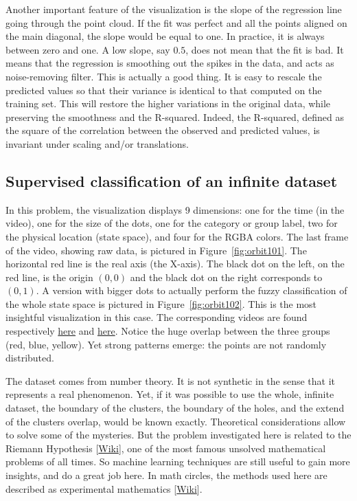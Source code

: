 \documentclass[oneside,10pt]{book}
\begin{document}
Another important feature of the visualization is the slope of the regression line going through the point cloud. If the fit was perfect and all the points aligned on the main diagonal, the slope would be equal to one. In practice, it is always between zero and one. A low slope, say $0.5$, does not mean that the fit is bad. It means that the regression is smoothing out the spikes in the data, and acts as noise-removing filter. This is actually a good thing. It is easy to rescale the predicted values so that their variance is identical to that computed on the training set. This will restore the higher variations in the original data, while preserving the smoothness and the R-squared. Indeed, the R-squared, defined as the square of the correlation between the observed and predicted values, is invariant under scaling and/or translations.

\subsection{Supervised classification of an infinite dataset}\label{scidf}

In this problem, the visualization displays 9 dimensions: one for the time (in the video), one for the size of the dots, one for the category or group label, two for the physical location (state space), and four for the RGBA colors. The last frame of the video, showing raw data, is pictured in Figure~\ref{fig:orbit101}.
The horizontal red line is the real axis (the X-axis).  The black dot on the left, on the red line, is the origin $(0,0)$ and the black dot on the right corresponds to $(0,1)$.  A version with bigger dots to actually perform the
\textcolor{index}{fuzzy classification} of the whole state space is pictured in Figure~\ref{fig:orbit102}. This is the most insightful visualization in this case. The corresponding videos are found respectively \href{https://youtu.be/HT8e3WsRLZI}{here} and \href{https://youtu.be/rRQbxpZAQ78}{here}. Notice the huge overlap between the three groups (red, blue, yellow). Yet strong patterns emerge: the points are not randomly distributed.

The dataset comes from number theory. It is not synthetic in the sense that it represents a real phenomenon. Yet, if it was possible to use the whole, infinite dataset, the boundary of the clusters, the boundary of the holes, and the extend of the clusters overlap, would be known exactly. Theoretical considerations allow to solve some of the mysteries. But the problem investigated here is related to the Riemann Hypothesis [\href{https://en.wikipedia.org/wiki/Riemann_hypothesis}{Wiki}], one of the most famous unsolved
mathematical problems of all times. So machine learning techniques are still useful to gain more insights, and do a great job here. In math circles, the
methods used here are described as \textcolor{index}{experimental mathematics} [\href{https://en.wikipedia.org/wiki/Experimental_mathematics}{Wiki}].
\end{document}
